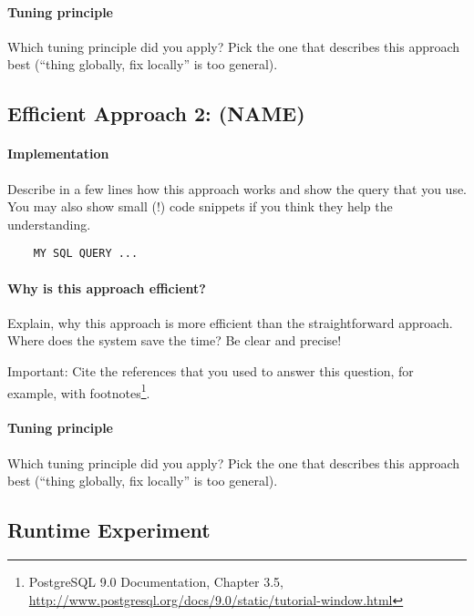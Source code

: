 \documentclass[11pt]{scrartcl}
\begin{document}
  \paragraph{Tuning principle}

  Which tuning principle did you apply? Pick the one that describes
  this approach best (``thing globally, fix locally'' is too general).

    \subsection*{Efficient Approach 2: (NAME)}

  \paragraph{Implementation}

  Describe in a few lines how this approach works and show the query
  that you use. You may also show small (!) code snippets if you think
  they help the understanding.

{\small
\begin{verbatim}
    MY SQL QUERY ...
\end{verbatim}
}

  \paragraph{Why is this approach efficient?}

  Explain, why this approach is more efficient than the
  straightforward approach. Where does the system save the time? Be
  clear and precise!
  
  Important: Cite the references that you used to answer this
  question, for example, with footnotes\footnote{PostgreSQL 9.0
    Documentation, Chapter 3.5,
    \url{http://www.postgresql.org/docs/9.0/static/tutorial-window.html}}.

  \paragraph{Tuning principle}

  Which tuning principle did you apply? Pick the one that describes
  this approach best (``thing globally, fix locally'' is too general).

  \subsection*{Runtime Experiment}
\end{document}
